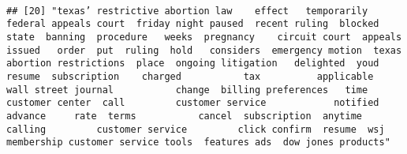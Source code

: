 \documentclass[
]{article}
\begin{document}
\begin{verbatim}
                                                                                                                                                                                                                                                                                                                                                                                                                                                                   
## [20] "texas’ restrictive abortion law    effect   temporarily   federal appeals court  friday night paused  recent ruling  blocked  state  banning  procedure   weeks  pregnancy    circuit court  appeals issued   order  put  ruling  hold   considers  emergency motion  texas    abortion restrictions  place  ongoing litigation   delighted  youd   resume  subscription    charged           tax          applicable   wall street journal           change  billing preferences   time   customer center  call         customer service            notified  advance     rate  terms           cancel  subscription  anytime  calling         customer service         click confirm  resume  wsj membership customer service tools  features ads  dow jones products"                                                                                                                                                                                                                                                                                                                                                                                                                                                                                                                                                                                                                                                                                                                                                                                                                                                                                                                                                                                                                                                                                                                                                                                                                                                                                                                                                                                                                                                                                                                                                                                                                                                                                                                                                                                                                                                                                                                                                                                                                                                                                                                                                                                                  
\end{verbatim}
\end{document}
